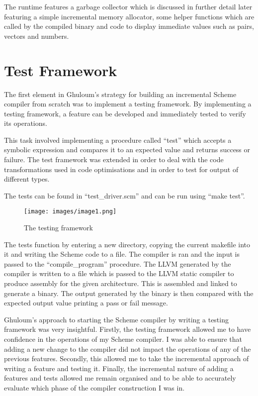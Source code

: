 \documentclass{article}
\begin{document}
The runtime features a garbage collector which is discussed in further detail later featuring a simple incremental memory allocator, some helper functions which are called by the compiled binary and code to display immediate values such as pairs, vectors and numbers.

\section{Test Framework}

The first element in Ghuloum's strategy for building an incremental Scheme compiler from scratch was to implement a testing framework. By implementing a testing framework, a feature can be developed and immediately tested to verify its operations. 

This task involved implementing a procedure called ``test'' which accepts a symbolic expression and compares it to an expected value and returns success or failure. The test framework was extended in order to deal with the code transformations used in code optimisations and in order to test for output of different types.

The tests can be found in ``test\_driver.scm'' and can be run using ``make test''.

\begin{figure}[!htb]
  \caption{The testing framework}
  \centering
  \texttt{[image: images/image1.png]}
\end{figure}

The tests function by entering a new directory, copying the current makefile into it and writing the Scheme code to a file. The compiler is ran and the input is passed to the ``compile\_program'' procedure. The LLVM generated by the compiler is written to a file which is passed to the LLVM static compiler to produce assembly for the given architecture. This is assembled and linked to generate a binary.  The output generated by the binary is then compared with the expected output value printing a pass or fail message.

Ghuloum's approach to starting the Scheme compiler by writing a testing framework was very insightful. Firstly, the testing framework allowed me to have confidence in the operations of my Scheme compiler. I was able to ensure that adding a new change to the compiler did not impact the operations of any of the previous features. Secondly, this allowed me to take the incremental approach of writing a feature and testing it. Finally, the incremental nature of adding a features and tests allowed me remain organised and to be able to accurately evaluate which phase of the compiler construction I was in.
\end{document}
